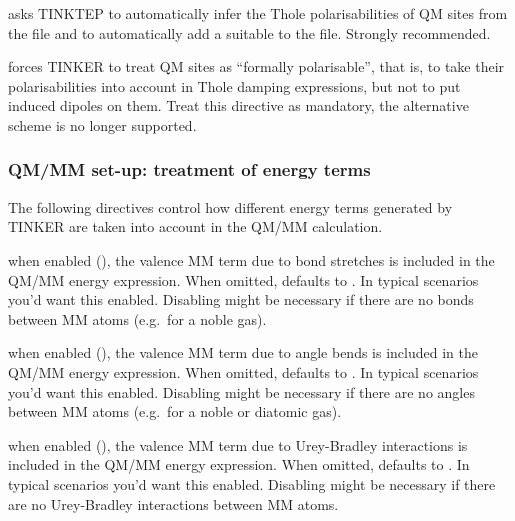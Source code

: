 \documentclass[letterpaper,10pt,english]{sphinxmanual}
\begin{document}
  \textendash{} asks
TINKTEP to automatically infer the Thole polarisabilities of QM sites
from the  file and to automatically add a suitable
 to the  file. Strongly
recommended.

  \textendash{} forces TINKER to
treat QM sites as “formally polarisable”, that is, to take their
polarisabilities into account in Thole damping expressions, but not to
put induced dipoles on them. Treat this directive as mandatory, the
alternative scheme is no longer supported.


\subsubsection{QM/MM set-up: treatment of energy terms}
\label{\detokenize{tinktep:qm-mm-set-up-treatment-of-energy-terms}}
The following directives control how different energy terms generated by
TINKER are taken into account in the QM/MM calculation.

  \textendash{} when
enabled (), the valence MM term due to bond stretches is included
in the QM/MM energy expression. When omitted, defaults to . In
typical scenarios you’d want this enabled. Disabling might be necessary
if there are no bonds between MM atoms (e.g. for a noble gas).

  \textendash{} when
enabled (), the valence MM term due to angle bends is included in
the QM/MM energy expression. When omitted, defaults to . In typical
scenarios you’d want this enabled. Disabling might be necessary if there
are no angles between MM atoms (e.g. for a noble or diatomic gas).

  \textendash{} when
enabled (), the valence MM term due to Urey-Bradley interactions is
included in the QM/MM energy expression. When omitted, defaults to
. In typical scenarios you’d want this enabled. Disabling might be
necessary if there are no Urey-Bradley interactions between MM atoms.
\end{document}
